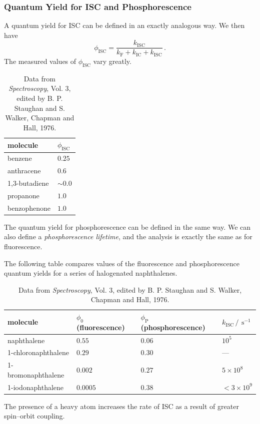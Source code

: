 \documentclass{article}
\theoremstyle{plain}\theoremheaderfont{\normalfont\itshape}\theorembodyfont{\rmfamily}\theoremseparator{.}\newtheorem*{rem}{Remark}\newtheorem*{ex}{Example}\newtheorem*{proof}{Proof}\newtheorem*{altp}{Alternative proof}
\theoremstyle{plain}\theoremheaderfont{\normalfont\bfseries}\theorembodyfont{\rmfamily}\theoremseparator{.}\newtheorem{thm}{Theorem}[section]\newtheorem{lem}[thm]{Lemma}\newtheorem{prop}[thm]{Proposition}\newtheorem*{cor}{Corollary}\newtheorem{defn}[thm]{Definition}\newtheorem{clm}[thm]{Claim}\newtheorem{clminproof}{Claim}\newtheorem{pos}{Postulate}[section]
\theoremstyle{break}\theoremheaderfont{\normalfont\itshape}\theorembodyfont{\rmfamily}\theoremseparator{.\medskip}\newtheorem*{proofskip}{Proof}\newtheorem*{exs}{Examples}\newtheorem*{rems}{Remarks}
\theoremstyle{break}\theoremheaderfont{\normalfont\bfseries}\theorembodyfont{\rmfamily}\theoremseparator{.\medskip}\newtheorem{lemskip}[thm]{Lemma}\newtheorem{defnskip}[thm]{Definition}\newtheorem{propskip}[thm]{Proposition}\newtheorem{thmskip}[thm]{Theorem}
\numberwithin{equation}{section}
\newcommand{\unit}[1]{\ \mathrm{#1}}
\newcommand{\FF}{_{\text{F}}}
\newcommand{\IC}{_{\text{IC}}}
\newcommand{\ISC}{_{\text{ISC}}}
\begin{document}
    \subsubsection{Quantum Yield for ISC and Phosphorescence}
    A quantum yield for ISC can be defined in an exactly analogous way. We then have
    \begin{equation}
        \phi\ISC=\frac{k\ISC}{k\FF+k\IC+k\ISC}\,.
    \end{equation}
    The measured values of \(\phi\ISC\) vary greatly.
    \begin{table}[ht!]
        \centering
        \begin{tabular}{ll}
            \toprule
            molecule & \(\phi\ISC\) \\ \midrule
            benzene & \(0.25\) \\
            anthracene & \(0.6\) \\
            1,3-butadiene & \(\sim 0.0\) \\
            propanone & \(1.0\) \\
            benzophenone & \(1.0\) \\ \bottomrule
        \end{tabular}
        \caption{Data from \textit{Spectroscopy}, Vol. 3, edited by B. P. Staughan and S. Walker, Chapman and Hall, 1976.}
    \end{table}

    The quantum yield for phosphorescence can be defined in the same way. We can also define a \textit{phosphorescence lifetime}, and the analysis is exactly the same as for fluorescence.

    The following table compares values of the fluorescence and phosphorescence quantum yields for a series of halogenated naphthalenes.

    \begin{table}[ht!]
        \centering
        \begin{tabular}{llll}
            \toprule
            molecule & \(\phi_0\) (fluorescence) & \(\phi_\text{P}\) (phosphorescence) & \(k\ISC\,/\,\unit{s}^{-1}\) \\ \midrule
            naphthalene & \(0.55\) & \(0.06\) & \(10^5\) \\
            1-chloronaphthalene & \(0.29\) & \(0.30\) & --- \\
            1-bromonaphthalene & \(0.002\) & \(0.27\) & \(5\times 10^8\) \\
            1-iodonaphthalene & \(0.0005\) & \(0.38\) & \(<3\times 10^9\) \\ \bottomrule
        \end{tabular}
        \caption{Data from \textit{Spectroscopy}, Vol. 3, edited by B. P. Staughan and S. Walker, Chapman and Hall, 1976.}
    \end{table}
    The presence of a heavy atom increases the rate of ISC as a result of greater spin--orbit coupling.
\end{document}
